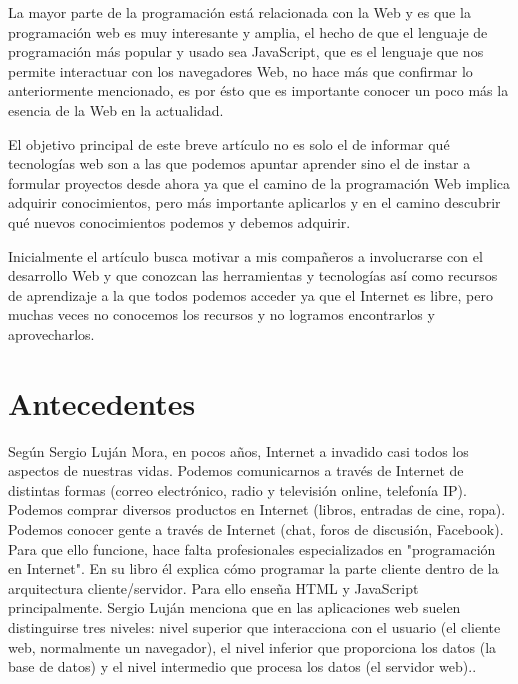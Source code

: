 \documentclass[twocolumns,a4paper]{IEEEtran}
\begin{document}
La mayor parte de la programación está relacionada con la Web y es que la
programación web es muy interesante y amplia, el hecho de que el lenguaje de
programación más popular y usado sea JavaScript, que es el lenguaje que nos
permite interactuar con los navegadores Web, no hace más que confirmar lo
anteriormente mencionado, es por ésto que es importante conocer un poco más la
esencia de la Web en la actualidad. 


El objetivo principal de este breve artículo no es solo el de informar qué
tecnologías web son a las que podemos apuntar aprender sino el de instar a
formular proyectos desde ahora ya que el camino de la programación Web implica
adquirir conocimientos, pero más importante aplicarlos y en el camino descubrir
qué nuevos conocimientos podemos y debemos adquirir.

Inicialmente el artículo busca motivar a mis compañeros a involucrarse con el
desarrollo Web y que conozcan las herramientas y tecnologías así como recursos
de aprendizaje a la que todos podemos acceder ya que el Internet es libre, pero
muchas veces no conocemos los recursos y no logramos encontrarlos y
aprovecharlos.

\section{Antecedentes}
Según Sergio Luján Mora, en pocos años, Internet a invadido casi todos los
aspectos de nuestras vidas. Podemos comunicarnos a través de Internet de
distintas formas (correo electrónico, radio y televisión online, telefonía IP).
Podemos comprar diversos productos en Internet (libros, entradas de cine,
ropa). Podemos conocer gente a través de Internet (chat, foros de discusión,
Facebook). Para que ello funcione, hace falta profesionales especializados en
"programación en Internet". En su libro él explica cómo programar la parte
cliente dentro de la arquitectura cliente/servidor. Para ello enseña HTML y
JavaScript principalmente. Sergio Luján menciona que en las aplicaciones web
suelen distinguirse tres niveles: nivel superior que interacciona con el
usuario (el cliente web, normalmente un navegador), el nivel inferior que
proporciona los datos (la base de datos) y el nivel intermedio que procesa los
datos (el servidor web).\cite{SergioLujan2001}.
\newline
\end{document}
